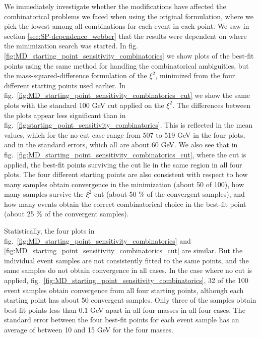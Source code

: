 \documentclass[twoside,english]{uiofysmaster}
\begin{document}
We immediately investigate whether the modifications have affected the combinatorical problems we faced when using the original formulation, where we pick the lowest among all combinations for each event in each point. We saw in section \ref{sec:SP-dependence_webber} that the results were dependent on where the minimization search was started. In fig. \ref{fig:MD_starting_point_sensitivity_combinatorics} we show plots of the best-fit points using the same method for handling the combinatorical ambiguities, but the mass-squared-difference formulation of the $\xi^2$, minimized from the four different starting points used earlier. In fig.\ \ref{fig:MD_starting_point_sensitivity_combinatorics_cut} we show the same plots with the standard 100 GeV cut applied on the $\xi^2$. The differences between the plots appear less significant than in fig.\ \ref{fig:starting_point_sensitivity_combinatorics}. This is reflected in the mean values, which for the no-cut case range from 507 to 519 GeV in the four plots, and in the standard errors, which all are about 60 GeV. We also see that in fig.\ \ref{fig:MD_starting_point_sensitivity_combinatorics_cut}, where the cut is applied, the best-fit points surviving the cut lie in the same region in all four plots. The four different starting points are also consistent with respect to how many samples obtain convergence in the minimization (about 50 of 100), how many samples survive the $\xi^2$ cut (about 50 \% of the convergent samples), and how many events obtain the correct combinatorical choice in the best-fit point (about 25 \% of the convergent samples). 

Statistically, the four plots in fig.\ \ref{fig:MD_starting_point_sensitivity_combinatorics} and \ref{fig:MD_starting_point_sensitivity_combinatorics_cut} are similar. But the individual event samples are not consistently fitted to the same points, and the same samples do not obtain convergence in all cases. In the case where no cut is applied, fig.\ \ref{fig:MD_starting_point_sensitivity_combinatorics}, 32 of the 100 event samples obtain convergence from all four starting points, although each starting point has about 50 convergent samples. Only three of the samples obtain best-fit points less than $0.1$ GeV apart in all four masses in all four cases. The standard error between the four best-fit points for each event sample has an average of between 10 and 15 GeV for the four masses.
\end{document}
